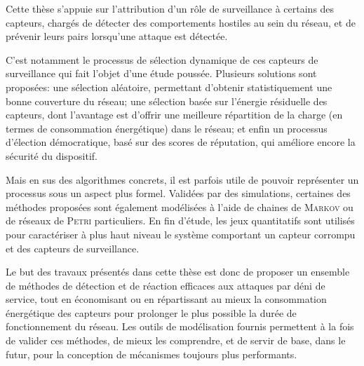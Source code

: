 Cette thèse s'appuie sur l'attribution d'un rôle de surveillance à certains des capteurs, chargés de détecter des comportements hostiles au sein du réseau, et de prévenir leurs pairs lorsqu'une attaque est détectée.

C'est notamment le processus de sélection dynamique de ces capteurs de surveillance qui fait l'objet d'une étude poussée.
Plusieurs solutions sont proposées: une sélection aléatoire, permettant d'obtenir statistiquement une bonne couverture du réseau; une sélection basée sur l'énergie résiduelle des capteurs, dont l'avantage est d'offrir une meilleure répartition de la charge (en termes de consommation énergétique) dans le réseau; et enfin un processus d'élection démocratique, basé sur des scores de réputation, qui améliore encore la sécurité du dispositif.

Mais en sus des algorithmes concrets, il est parfois utile de pouvoir représenter un processus sous un aspect plus formel.
Validées par des simulations, certaines des méthodes proposées sont également modélisées à l'aide de chaines de \textsc{Markov} ou de réseaux de \textsc{Petri} particuliers.
En fin d'étude, les jeux quantitatifs sont utilisés pour caractériser à plus haut niveau le système comportant un capteur corrompu et des capteurs de surveillance.
\pagebreak %

Le but des travaux présentés dans cette thèse est donc de proposer un ensemble de méthodes de détection et de réaction efficaces aux attaques par déni de service, tout en économisant ou en répartissant au mieux la consommation énergétique des capteurs pour prolonger le plus possible la durée de fonctionnement du réseau.
Les outils de modélisation fournis permettent à la fois de valider ces méthodes, de mieux les comprendre, et de servir de base, dans le futur, pour la conception de mécanismes toujours plus performants.
